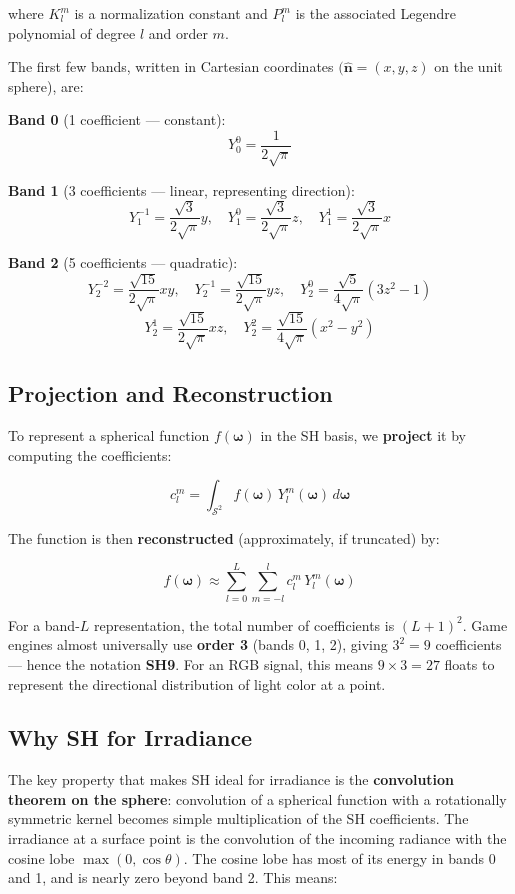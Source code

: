 \documentclass[
  11pt,
  letterpaper,
  DIV=11,
  numbers=noendperiod,
  twoside,
  open=right]{scrreprt}
\begin{document}
where \(K_l^m\) is a normalization constant and \(P_l^m\) is the
associated Legendre polynomial of degree \(l\) and order \(m\).

The first few bands, written in Cartesian coordinates
\((\hat{\mathbf{n}} = (x, y, z)\) on the unit sphere), are:

\textbf{Band 0} (1 coefficient --- constant): \[
Y_0^0 = \frac{1}{2\sqrt{\pi}}
\]

\textbf{Band 1} (3 coefficients --- linear, representing direction): \[
Y_1^{-1} = \frac{\sqrt{3}}{2\sqrt{\pi}} y, \quad
Y_1^{0} = \frac{\sqrt{3}}{2\sqrt{\pi}} z, \quad
Y_1^{1} = \frac{\sqrt{3}}{2\sqrt{\pi}} x
\]

\textbf{Band 2} (5 coefficients --- quadratic): \[
Y_2^{-2} = \frac{\sqrt{15}}{2\sqrt{\pi}} xy, \quad
Y_2^{-1} = \frac{\sqrt{15}}{2\sqrt{\pi}} yz, \quad
Y_2^{0} = \frac{\sqrt{5}}{4\sqrt{\pi}} (3z^2 - 1)
\] \[
Y_2^{1} = \frac{\sqrt{15}}{2\sqrt{\pi}} xz, \quad
Y_2^{2} = \frac{\sqrt{15}}{4\sqrt{\pi}} (x^2 - y^2)
\]

\subsection{Projection and
Reconstruction}\label{projection-and-reconstruction}

To represent a spherical function \(f(\boldsymbol{\omega})\) in the SH
basis, we \textbf{project} it by computing the coefficients:

\[
c_l^m = \int_{\mathcal{S}^2} f(\boldsymbol{\omega}) \, Y_l^m(\boldsymbol{\omega}) \, d\boldsymbol{\omega}
\]

The function is then \textbf{reconstructed} (approximately, if
truncated) by:

\[
f(\boldsymbol{\omega}) \approx \sum_{l=0}^{L} \sum_{m=-l}^{l} c_l^m \, Y_l^m(\boldsymbol{\omega})
\]

For a band-\(L\) representation, the total number of coefficients is
\((L+1)^2\). Game engines almost universally use \textbf{order 3} (bands
0, 1, 2), giving \(3^2 = 9\) coefficients --- hence the notation
\textbf{SH9}. For an RGB signal, this means \(9 \times 3 = 27\) floats
to represent the directional distribution of light color at a point.

\subsection{Why SH for Irradiance}\label{why-sh-for-irradiance}

The key property that makes SH ideal for irradiance is the
\textbf{convolution theorem on the sphere}: convolution of a spherical
function with a rotationally symmetric kernel becomes simple
multiplication of the SH coefficients. The irradiance at a surface point
is the convolution of the incoming radiance with the cosine lobe
\(\max(0, \cos\theta)\). The cosine lobe has most of its energy in bands
0 and 1, and is nearly zero beyond band 2. This means:
\end{document}
